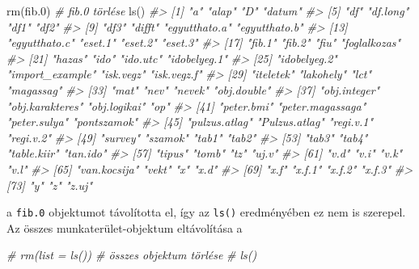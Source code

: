 \documentclass[
]{book}
\newenvironment{Shaded}{\begin{snugshade}}{\end{snugshade}}
\newcommand{\CommentTok}[1]{\textcolor[rgb]{0.56,0.35,0.01}{\textit{#1}}}
\newcommand{\FloatTok}[1]{\textcolor[rgb]{0.00,0.00,0.81}{#1}}
\newcommand{\FunctionTok}[1]{\textcolor[rgb]{0.00,0.00,0.00}{#1}}
\newcommand{\NormalTok}[1]{#1}
\begin{document}
\begin{Shaded}
\begin{Highlighting}[]
\FunctionTok{rm}\NormalTok{(fib}\FloatTok{.0}\NormalTok{)         }\CommentTok{\# fib.0 törlése}
\FunctionTok{ls}\NormalTok{()}
\CommentTok{\#\textgreater{}  [1] "a"               "alap"            "D"               "datum"          }
\CommentTok{\#\textgreater{}  [5] "df"              "df.long"         "df1"             "df2"            }
\CommentTok{\#\textgreater{}  [9] "df3"             "difft"           "egyutthato.a"    "egyutthato.b"   }
\CommentTok{\#\textgreater{} [13] "egyutthato.c"    "eset.1"          "eset.2"          "eset.3"         }
\CommentTok{\#\textgreater{} [17] "fib.1"           "fib.2"           "fiu"             "foglalkozas"    }
\CommentTok{\#\textgreater{} [21] "hazas"           "ido"             "ido.utc"         "idobelyeg.1"    }
\CommentTok{\#\textgreater{} [25] "idobelyeg.2"     "import\_example"  "isk.vegz"        "isk.vegz.f"     }
\CommentTok{\#\textgreater{} [29] "iteletek"        "lakohely"        "lct"             "magassag"       }
\CommentTok{\#\textgreater{} [33] "mat"             "nev"             "nevek"           "obj.double"     }
\CommentTok{\#\textgreater{} [37] "obj.integer"     "obj.karakteres"  "obj.logikai"     "op"             }
\CommentTok{\#\textgreater{} [41] "peter.bmi"       "peter.magassaga" "peter.sulya"     "pontszamok"     }
\CommentTok{\#\textgreater{} [45] "pulzus.atlag"    "Pulzus.atlag"    "regi.v.1"        "regi.v.2"       }
\CommentTok{\#\textgreater{} [49] "survey"          "szamok"          "tab1"            "tab2"           }
\CommentTok{\#\textgreater{} [53] "tab3"            "tab4"            "table.kiir"      "tan.ido"        }
\CommentTok{\#\textgreater{} [57] "tipus"           "tomb"            "tz"              "uj.v"           }
\CommentTok{\#\textgreater{} [61] "v.d"             "v.i"             "v.k"             "v.l"            }
\CommentTok{\#\textgreater{} [65] "van.kocsija"     "vekt"            "x"               "x.d"            }
\CommentTok{\#\textgreater{} [69] "x.f"             "x.f.1"           "x.f.2"           "x.f.3"          }
\CommentTok{\#\textgreater{} [73] "y"               "z"               "z.uj"}
\end{Highlighting}
\end{Shaded}

a \texttt{fib.0} objektumot távolította el, így az \texttt{ls()} eredményében ez nem is szerepel. Az összes munkaterület-objektum eltávolítása a

\begin{Shaded}
\begin{Highlighting}[]
\CommentTok{\# rm(list = ls())   \# összes objektum törlése}
\CommentTok{\# ls()}
\end{Highlighting}
\end{Shaded}
\end{document}
